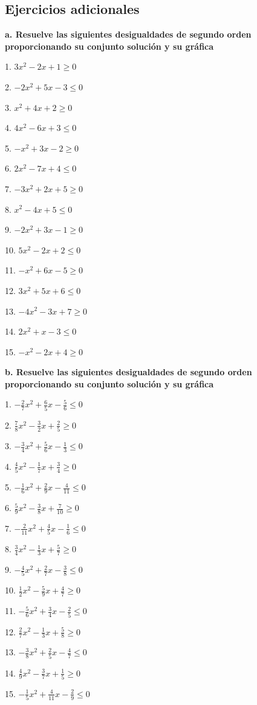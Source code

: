 \documentclass[]{book}
\begin{document}
\subsection{Ejercicios adicionales}\label{ejercicios-adicionales-1}

\textbf{a. Resuelve las siguientes desigualdades de segundo orden
proporcionando su conjunto solución y su gráfica}

\begin{multicols}{2}
1. $3x^2 - 2x + 1 \geq 0$

2. $-2x^2 + 5x - 3 \leq 0$

3. $x^2 + 4x + 2 \geq 0$

4. $4x^2 - 6x + 3 \leq 0$

5. $-x^2 + 3x - 2 \geq 0$

6. $2x^2 - 7x + 4 \leq 0$

7. $-3x^2 + 2x + 5 \geq 0$

8. $x^2 - 4x + 5 \leq 0$

9. $-2x^2 + 3x - 1 \geq 0$

10. $5x^2 - 2x + 2 \leq 0$

11. $-x^2 + 6x - 5 \geq 0$

12. $3x^2 + 5x + 6 \leq 0$

13. $-4x^2 - 3x + 7 \geq 0$

14. $2x^2 + x - 3 \leq 0$

15. $-x^2 - 2x + 4 \geq 0$
\end{multicols}

\textbf{b. Resuelve las siguientes desigualdades de segundo orden
proporcionando su conjunto solución y su gráfica}

\begin{multicols}{2}
1. $-\frac{2}{7}x^2 + \frac{6}{5}x - \frac{5}{6} \leq 0$

2. $\frac{7}{8}x^2 - \frac{3}{2}x + \frac{2}{5} \geq 0$

3. $-\frac{3}{4}x^2 + \frac{5}{6}x - \frac{1}{3} \leq 0$

4. $\frac{4}{5}x^2 - \frac{1}{7}x + \frac{3}{4} \geq 0$

5. $-\frac{1}{6}x^2 + \frac{2}{9}x - \frac{4}{11} \leq 0$

6. $\frac{5}{9}x^2 - \frac{3}{8}x + \frac{7}{10} \geq 0$

7. $-\frac{2}{11}x^2 + \frac{4}{5}x - \frac{1}{6} \leq 0$

8. $\frac{3}{4}x^2 - \frac{1}{3}x + \frac{5}{7} \geq 0$

9. $-\frac{4}{5}x^2 + \frac{2}{7}x - \frac{3}{8} \leq 0$

10. $\frac{1}{2}x^2 - \frac{5}{9}x + \frac{4}{7} \geq 0$

11. $-\frac{5}{6}x^2 + \frac{3}{4}x - \frac{2}{5} \leq 0$

12. $\frac{2}{7}x^2 - \frac{1}{3}x + \frac{5}{8} \geq 0$

13. $-\frac{3}{8}x^2 + \frac{2}{5}x - \frac{4}{7} \leq 0$

14. $\frac{4}{9}x^2 - \frac{3}{7}x + \frac{1}{5} \geq 0$

15. $-\frac{1}{5}x^2 + \frac{4}{11}x - \frac{2}{9} \leq 0$
\end{multicols}
\end{document}

